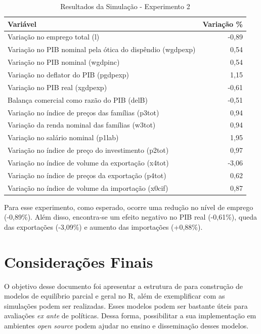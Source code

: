 \documentclass[12pt,twoside]{article}
\begin{document}
\begin{table}[!h]

\caption{\label{tab:unnamed-chunk-78}Resultados da Simulação - Experimento 2}
\centering
\begin{tabular}[t]{lr}
\toprule
Variável & Variação \%\\
\midrule
Variação no emprego total (l) & -0,89\\
Variação no PIB nominal pela ótica do dispêndio (wgdpexp) & 0,54\\
Variação no PIB nominal (wgdpinc) & 0,54\\
Variação no deflator do PIB (pgdpexp) & 1,15\\
Variação no PIB real (xgdpexp) & -0,61\\
Balança comercial como razão do PIB (delB) & -0,51\\
Variação no índice de preços das famílias (p3tot) & 0,94\\
Variação da renda nominal das famílias (w3tot) & 0,94\\
Variação no salário nominal (p1lab) & 1,95\\
Variação no índice de preço do investimento (p2tot) & 0,97\\
Variação no índice de volume da exportação (x4tot) & -3,06\\
Variação no índice de preços da exportação (p4tot) & 0,62\\
Variação no índice de volume da importação (x0cif) & 0,87\\
\bottomrule
\end{tabular}
\end{table}

Para esse experimento, como esperado, ocorre uma redução no nível de
emprego (-0,89\%). Além disso, encontra-se um efeito negativo no PIB
real (-0,61\%), queda das exportações (-3,09\%) e aumento das
importações (+0,88\%).

\hypertarget{considerauxe7uxf5es-finais}{%
\section{Considerações Finais}\label{considerauxe7uxf5es-finais}}

O objetivo desse documento foi apresentar a estrutura de para construção
de modelos de equilíbrio parcial e geral no R, além de exemplificar com
as simulações podem ser realizadas. Esses modelos podem ser bastante
úteis para avaliações \emph{ex ante} de políticas. Dessa forma,
possibilitar a sua implementação em ambientes \emph{open source} podem
ajudar no ensino e disseminação desses modelos.

\newpage


\end{document}
